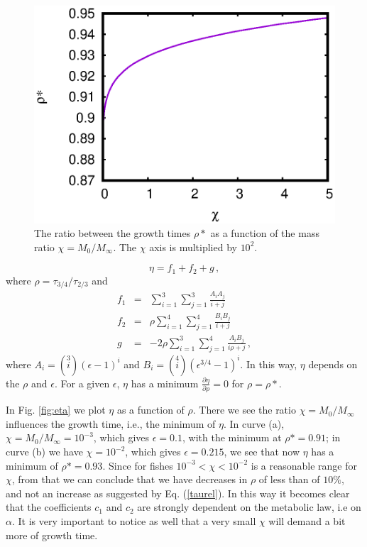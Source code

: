 \documentclass[10pt]{iopart}
\begin{document}
\begin{figure}%
\centering
\includegraphics[width=.8\columnwidth]{figure_2}%
\caption{ The ratio between the growth times $\rho*$ as a function of the mass ratio $\chi=M_0/M_\infty$.  The $\chi$ axis is multiplied by $10^2$. }
\label{fig:rho}
\end{figure}


\begin{equation}
\eta  = f_1 + f_2 + g\,,
\end{equation}
where $\rho=\tau_{3/4}/\tau_{2/3}$ and
\begin{eqnarray}
f_{1}&=&\sum_{i = 1}^3\sum_{j = 1}^3 \frac{A_{i}A_{j}}{i+j}\\
f_{2}&=&\rho\sum_{i = 1}^4\sum_{j = 1}^4 \frac{B_{i}B_{j}}{i+j}\\
g&=&-2\rho\sum_{i = 1}^3\sum_{j = 1}^4 \frac{A_{i}B_{j}}{i\rho+j}\,,
\end{eqnarray}
where $A_i=\left(\stackrel{3}{i}\right)(\epsilon -1)^{i}$ and $B_i=\left(\stackrel{4}{i}\right)(\epsilon^{3/4} -1)^{i}$. In this way, $\eta$ depends on the $\rho$ and $\epsilon$. For a given $\epsilon$, $\eta$ has a minimum $\frac{\partial \eta}{\partial \rho}=0$ for $\rho=\rho*$.

In  Fig. \ref{fig:eta} we plot $\eta$ as a function of $\rho$. There we see the ratio  $\chi=M_0/M_{\infty}$ influences the growth time, i.e., the minimum of $\eta$.  In curve (a), $\chi=M_0/M_{\infty}=10^{-3}$, which gives $\epsilon = 0.1$, with the minimum at $\rho*=0.91$; in curve (b) we have $\chi=10^{-2}$, which gives $\epsilon=0.215$, we see that now $\eta$ has a minimum of $\rho* = 0.93$. Since for fishes  $10^{-3} < \chi < 10^{-2}$ is a reasonable range for $\chi$, from that we can conclude that we have decreases in $\rho$ of less than of $10\%$, and not an increase as suggested by Eq. (\ref{taurel}).  In this way it becomes clear that the coefficients $c_1$ and $c_2$ are strongly dependent on the metabolic law, i.e on  $\alpha$.
It is very important to notice as well that a very small $\chi$ will demand a bit more of  growth time.
\end{document}
